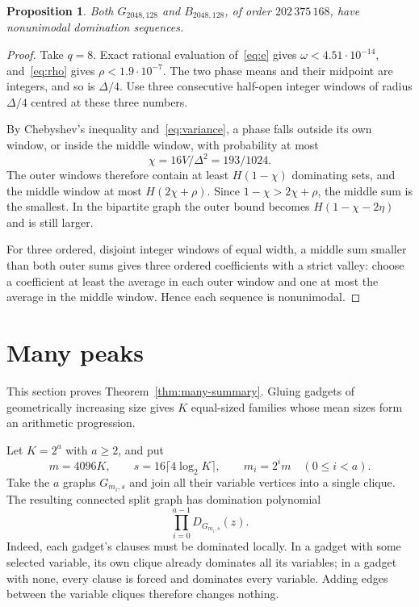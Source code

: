 \documentclass[11pt,a4paper]{article}
\newtheorem{proposition}[theorem]{Proposition}
\theoremstyle{definition}
\theoremstyle{remark}
\begin{document}
\begin{proposition}\label{prop:elementary}
Both $G_{2048,128}$ and $B_{2048,128}$, of order $202\,375\,168$, have nonunimodal domination sequences.
\end{proposition}
\begin{proof}
Take $q=8$. Exact rational evaluation of~\eqref{eq:e} gives $\omega<4.51\cdot10^{-14}$, and~\eqref{eq:rho} gives $\rho<1.9\cdot10^{-7}$. The two phase means and their midpoint are integers, and so is $\Delta/4$. Use three consecutive half-open integer windows of radius $\Delta/4$ centred at these three numbers.

By Chebyshev's inequality and~\eqref{eq:variance}, a phase falls outside its own window, or inside the middle window, with probability at most
\[
\chi=16V/\Delta^2=193/1024 .
\]
The outer windows therefore contain at least $H(1-\chi)$ dominating sets, and the middle window at most $H(2\chi+\rho)$. Since $1-\chi>2\chi+\rho$, the middle sum is the smallest. In the bipartite graph the outer bound becomes $H(1-\chi-2\eta)$ and is still larger.

For three ordered, disjoint integer windows of equal width, a middle sum smaller than both outer sums gives three ordered coefficients with a strict valley: choose a coefficient at least the average in each outer window and one at most the average in the middle window. Hence each sequence is nonunimodal.
\end{proof}

\section{Many peaks}\label{sec:many}
This section proves Theorem~\ref{thm:many-summary}. Gluing gadgets of geometrically increasing size gives $K$ equal-sized families whose mean sizes form an arithmetic progression.

Let $K=2^a$ with $a\ge2$, and put
\[
m=4096K,\qquad s=16\lceil4\log_2K\rceil,\qquad m_i=2^im
\quad(0\le i<a).
\]
Take the $a$ graphs $G_{m_i,s}$ and join all their variable vertices into a single clique. The resulting connected split graph has domination polynomial
\begin{equation}\label{eq:product}
\prod_{i=0}^{a-1}D_{G_{m_i,s}}(z).
\end{equation}
Indeed, each gadget's clauses must be dominated locally. In a gadget with some selected variable, its own clique already dominates all its variables; in a gadget with none, every clause is forced and dominates every variable. Adding edges between the variable cliques therefore changes nothing.
\end{document}
